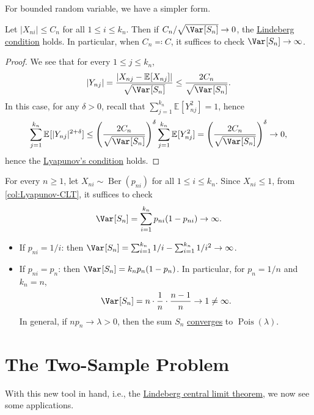 For bounded random variable, we have a simpler form.

\begin{corollary}\label{col:Lyapunov-CLT}
	Let \(\vert X_{ni} \vert \leq C_n\) for all \(1 \leq i \leq k_n\). Then if \(C_n / \sqrt{\Var_{}[S_n] } \to 0\), the \hyperref[def:Lindeberg-condition]{Lindeberg condition} holds. In particular, when \(C_n \eqqcolon C\), it suffices to check \(\Var_{}[S_n] \to \infty \).
\end{corollary}
\begin{proof}
	We see that for every \(1 \leq j \leq k_n\),
	\[
		\vert Y_{nj} \vert
		= \frac{\vert X_{nj} - \mathbb{E}_{}[X_{nj}] \vert }{\sqrt{\Var_{}[S_n] } }
		\leq \frac{2 C_n}{\sqrt{\Var_{}[S_n] } }.
	\]
	In this case, for any \(\delta > 0\), recall that \(\sum_{j=1}^{k_n} \mathbb{E}_{}[Y_{nj}^2] = 1\), hence
	\[
		\sum_{j=1}^{k_n} \mathbb{E}_{}[\vert Y_{nj} \vert ^{2 + \delta }]
		\leq \left( \frac{2C_n}{\sqrt{\Var_{}[S_n] } } \right) ^\delta \sum_{j=1}^{k_n} \mathbb{E}_{}[Y_{nj}^2]
		= \left( \frac{2C_n}{\sqrt{\Var_{}[S_n] } } \right) ^\delta
		\to 0,
	\]
	hence the \hyperref[thm:Lyapunov-CLT]{Lyapunov's condition} holds.
\end{proof}

\begin{eg}\label{eg:Lyapunov-CLT}
	For every \(n \geq 1\), let \(X_{ni} \sim \operatorname{Ber}(p_{ni}) \) for all \(1 \leq i \leq k_n\). Since \(X_{ni} \leq 1\), from \autoref{col:Lyapunov-CLT}, it suffices to check
	\[
		\Var_{}[S_n]
		= \sum_{i=1}^{k_n} p_{ni} (1 - p_{ni}) \to \infty .
	\]
	\begin{itemize}
		\item If \(p_{ni} = 1 / i\): then \(\Var_{}[S_n] = \sum_{i=1}^{k_n} 1 / i - \sum_{i=1}^{k_n} 1 / i^2 \to \infty \).
		\item If \(p_{ni} = p_n\): then \(\Var_{}[S_n] = k_n p_n (1 - p_n)\). In particular, for \(p_n = 1 / n\) and \(k_n = n\),
		      \[
			      \Var_{}[S_n]
			      = n \cdot \frac{1}{n} \cdot \frac{n-1}{n}
			      \to 1
			      \neq \infty .
		      \]
		      In general, if \(n p_n \to \lambda > 0\), then the sum \(S_n\) \hyperref[def:converge-in-distribution]{converges} to \(\operatorname{Pois}(\lambda ) \).
	\end{itemize}
\end{eg}

\section{The Two-Sample Problem}
With this new tool in hand, i.e., the \hyperref[thm:Lindeberg-CLT]{Lindeberg central limit theorem}, we now see some applications.


